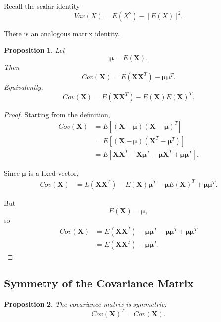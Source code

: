 \documentclass[11pt]{article}
\theoremstyle{definition}
\theoremstyle{plain}
\newtheorem{proposition}{Proposition}
\theoremstyle{remark}
\begin{document}
Recall the scalar identity
\[
Var(X)=E(X^2)-[E(X)]^2.
\]

There is an analogous matrix identity.

\begin{proposition}
Let
\[
\boldsymbol{\mu}=E(\mathbf{X}).
\]
Then
\[
{
Cov(\mathbf{X})
=
E(\mathbf{X}\mathbf{X}^T)
-
\boldsymbol{\mu}\boldsymbol{\mu}^T.
}
\]
Equivalently,
\[
{
Cov(\mathbf{X})
=
E(\mathbf{X}\mathbf{X}^T)
-
E(\mathbf{X})E(\mathbf{X})^T.
}
\]
\end{proposition}

\begin{proof}
Starting from the definition,
\begin{align*}
Cov(\mathbf{X})
&=
E\left[
(\mathbf{X}-\boldsymbol{\mu})
(\mathbf{X}-\boldsymbol{\mu})^T
\right]
\\
&=
E\left[
(\mathbf{X}-\boldsymbol{\mu})
(\mathbf{X}^T-\boldsymbol{\mu}^T)
\right]
\\
&=
E\left[
\mathbf{X}\mathbf{X}^T
-
\mathbf{X}\boldsymbol{\mu}^T
-
\boldsymbol{\mu}\mathbf{X}^T
+
\boldsymbol{\mu}\boldsymbol{\mu}^T
\right].
\end{align*}

Since $\boldsymbol{\mu}$ is a fixed vector,
\begin{align*}
Cov(\mathbf{X})
&=
E(\mathbf{X}\mathbf{X}^T)
-
E(\mathbf{X})\boldsymbol{\mu}^T
-
\boldsymbol{\mu}E(\mathbf{X})^T
+
\boldsymbol{\mu}\boldsymbol{\mu}^T.
\end{align*}

But
\[
E(\mathbf{X})=\boldsymbol{\mu},
\]
so
\begin{align*}
Cov(\mathbf{X})
&=
E(\mathbf{X}\mathbf{X}^T)
-
\boldsymbol{\mu}\boldsymbol{\mu}^T
-
\boldsymbol{\mu}\boldsymbol{\mu}^T
+
\boldsymbol{\mu}\boldsymbol{\mu}^T
\\
&=
E(\mathbf{X}\mathbf{X}^T)
-
\boldsymbol{\mu}\boldsymbol{\mu}^T.
\end{align*}
\end{proof}


\subsection*{Symmetry of the Covariance Matrix}

\begin{proposition}
The covariance matrix is symmetric:
\[
{
Cov(\mathbf{X})^T=Cov(\mathbf{X}).
}
\]
\end{proposition}
\end{document}
